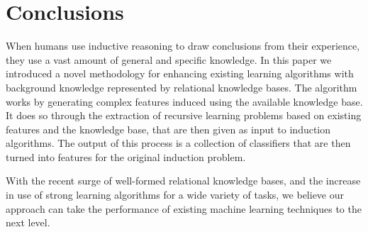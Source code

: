 \documentclass{article}
\theoremstyle{definition}
\begin{document}

\section{Conclusions}

When humans use inductive reasoning to draw conclusions from their experience, they use a vast amount of general and specific knowledge. In this paper we introduced a novel methodology for enhancing existing learning algorithms with background knowledge represented by relational knowledge bases.
The algorithm works by generating complex features induced using the available knowledge base. It does so through the extraction of recursive learning problems based on existing features and the knowledge base, that are then given as input to induction algorithms. The output of this process is a collection of classifiers that are then turned into features for the original induction problem.

With the recent surge of well-formed relational knowledge bases,
and the increase in use of strong learning algorithms for a wide variety of tasks,
we believe our approach can take the performance of existing machine learning techniques to the next level.

\clearpage


\end{document}
